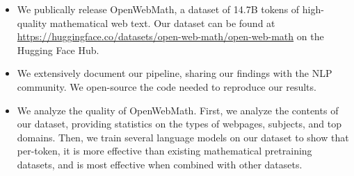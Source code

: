 \begin{itemize}
    \item We publically release OpenWebMath, a dataset of 14.7B tokens of high-quality mathematical web text. Our dataset can be found at \href{https://huggingface.co/datasets/open-web-math/open-web-math}{https://huggingface.co/datasets/open-web-math/open-web-math} on the Hugging Face Hub.
    \item We extensively document our pipeline, sharing our findings with the NLP community. We open-source the code needed to reproduce our results.
    \item We analyze the quality of OpenWebMath. First, we analyze the contents of our dataset, providing statistics on the types of webpages, subjects, and top domains. Then, we train several language models on our dataset to show that per-token, it is more effective than existing mathematical pretraining datasets, and is most effective when combined with other datasets.
\end{itemize}